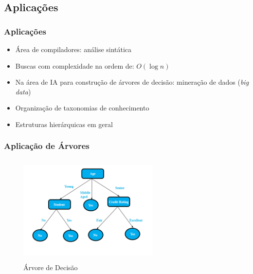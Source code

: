 
\subsection{Aplicações}

\begin{frame}

    \frametitle{Aplicações}

    \begin{itemize}
      \item  Área de compiladores: análise sintática 
      \item  Buscas com complexidade na ordem de: $O(\log n)$ 
      \item  Na área de IA para construção de árvores de decisão: mineração de dados (\textit{big data})
      \item  Organização de taxonomias de conhecimento
      \item  Estruturas hierárquicas em geral      
      
    \end{itemize}    
    
\end{frame}



\begin{frame}

\frametitle{Aplicação  de Árvores}

  \begin{figure}[!ht]
     \centering
    \includegraphics[width=7cm, height=5.5cm]{figs/fig_arvores/aplicacao_decision_tree.png}
    \caption{Árvore de Decisão}
    \end{figure}

\end{frame}

